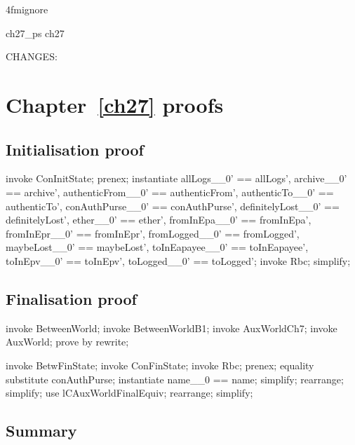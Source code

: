 \ai4fmignore{
\begin{zsection}
  \SECTION ch27\_ps \parents ch27
\end{zsection}
CHANGES:
}
\chapter{Chapter~\ref{ch27} proofs}

\section{Initialisation proof}

\begin{LPScript}\begin{zproof}[tBetwConcInit]
    invoke ConInitState;
    prenex;
    instantiate allLogs\_\_0' == allLogs',
        archive\_\_0' == archive', authenticFrom\_\_0' == authenticFrom',
        authenticTo\_\_0' == authenticTo', conAuthPurse\_\_0' == conAuthPurse',
        definitelyLost\_\_0' == definitelyLost', ether\_\_0' == ether',
        fromInEpa\_\_0' == fromInEpa', fromInEpr\_\_0' == fromInEpr',
        fromLogged\_\_0' == fromLogged', maybeLost\_\_0' == maybeLost',
        toInEapayee\_\_0' == toInEapayee', toInEpv\_\_0' == toInEpv',
        toLogged\_\_0' == toLogged';
    invoke Rbc;
    simplify;
\end{zproof}\end{LPScript}

\section{Finalisation proof}

\begin{LPScript}\begin{zproof}[lCAuxWorldFinalEquiv]
    invoke BetweenWorld;
    invoke BetweenWorldB1;
    invoke AuxWorldCh7;
    invoke AuxWorld;
    prove by rewrite;
\end{zproof}\end{LPScript}

\begin{LPScript}\begin{zproof}[tBetwConcFinal]
    invoke BetwFinState;
    invoke ConFinState;
    invoke Rbc;
    prenex;
    equality substitute conAuthPurse;
    instantiate name\_\_0 == name;
    simplify;
    rearrange;
    simplify;
    use lCAuxWorldFinalEquiv;
    rearrange;
    simplify;
\end{zproof}\end{LPScript}

\newpage
\section{Summary}\label{ch27.ps.summary}
\lpscriptsummary
